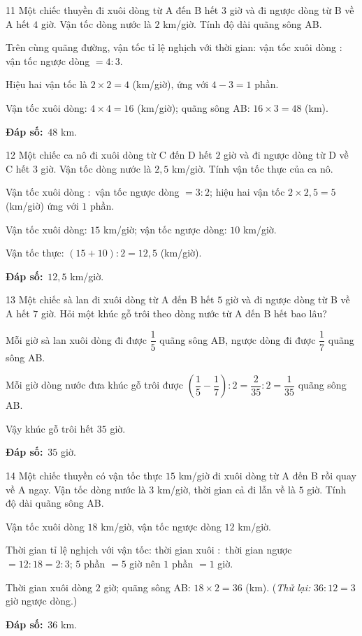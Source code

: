 \documentclass[11pt]{article}
\newif\ifsol \solfalse
\providecommand{\AnsWord}{Đáp số}
\newcommand{\dapso}[1]{\par\textbf{\AnsWord:}\ #1}
\newcommand{\probsol}[1]{%
  \begin{lrbox}{\solmeasure}\begin{minipage}{\dimexpr\linewidth-24pt\relax}#1\end{minipage}\end{lrbox}%
  \ifsol
    \begin{solbox}#1\end{solbox}%
  \else
    \setlength{\solht}{\dimexpr\ht\solmeasure+\dp\solmeasure+0.85cm\relax}%
    \ifdim\solht<1.35cm\setlength{\solht}{1.35cm}\fi
    \begin{tcolorbox}[colback=white,colframe=Line,boxrule=0.8pt,arc=5pt,
      left=8pt,right=8pt,top=4pt,bottom=4pt,height=\solht]{\footnotesize\color{Slate}\itshape\WorkWord}\end{tcolorbox}%
  \fi}
\newcommand{\gap}{\vspace{0.3cm}}
\def\WorkWord{Bài làm:}
\def\AnsWord{Đáp số}
\begin{document}
\gap
\begin{probbox}{11}{\relax}
Một chiếc thuyền đi xuôi dòng từ A đến B hết $3$ giờ và đi ngược dòng từ B về A hết $4$ giờ. Vận tốc dòng nước là $2$ km/giờ. Tính độ dài quãng sông AB.
\end{probbox}
\probsol{
Trên cùng quãng đường, vận tốc tỉ lệ nghịch với thời gian: vận tốc xuôi dòng $:$ vận tốc ngược dòng $=4:3$.\par
Hiệu hai vận tốc là $2\times2=4$ (km/giờ), ứng với $4-3=1$ phần.\par
Vận tốc xuôi dòng: $4\times4=16$ (km/giờ); quãng sông AB: $16\times3=48$ (km).
\dapso{$48$ km.}}
\gap
\begin{probbox}{12}{\relax}
Một chiếc ca nô đi xuôi dòng từ C đến D hết $2$ giờ và đi ngược dòng từ D về C hết $3$ giờ. Vận tốc dòng nước là $2{,}5$ km/giờ. Tính vận tốc thực của ca nô.
\end{probbox}
\probsol{
Vận tốc xuôi dòng $:$ vận tốc ngược dòng $=3:2$; hiệu hai vận tốc $2\times2{,}5=5$ (km/giờ) ứng với $1$ phần.\par
Vận tốc xuôi dòng: $15$ km/giờ; vận tốc ngược dòng: $10$ km/giờ.\par Vận tốc thực: $(15+10):2=12{,}5$ (km/giờ).
\dapso{$12{,}5$ km/giờ.}}
\gap
\begin{probbox}{13}{\relax}
Một chiếc sà lan đi xuôi dòng từ A đến B hết $5$ giờ và đi ngược dòng từ B về A hết $7$ giờ. Hỏi một khúc gỗ trôi theo dòng nước từ A đến B hết bao lâu?
\end{probbox}
\probsol{
Mỗi giờ sà lan xuôi dòng đi được $\dfrac15$ quãng sông AB, ngược dòng đi được $\dfrac17$ quãng sông AB.\par
Mỗi giờ dòng nước đưa khúc gỗ trôi được $\left(\dfrac15-\dfrac17\right):2=\dfrac2{35}:2=\dfrac1{35}$ quãng sông AB.\par Vậy khúc gỗ trôi hết $35$ giờ.
\dapso{$35$ giờ.}}
\gap
\begin{probbox}{14}{\relax}
Một chiếc thuyền có vận tốc thực $15$ km/giờ đi xuôi dòng từ A đến B rồi quay về A ngay. Vận tốc dòng nước là $3$ km/giờ, thời gian cả đi lẫn về là $5$ giờ. Tính độ dài quãng sông AB.
\end{probbox}
\probsol{
Vận tốc xuôi dòng $18$ km/giờ, vận tốc ngược dòng $12$ km/giờ.\par
Thời gian tỉ lệ nghịch với vận tốc: thời gian xuôi $:$ thời gian ngược $=12:18=2:3$; $5$ phần $=5$ giờ nên $1$ phần $=1$ giờ.\par
Thời gian xuôi dòng $2$ giờ; quãng sông AB: $18\times2=36$ (km). (\emph{Thử lại:} $36:12=3$ giờ ngược dòng.)
\dapso{$36$ km.}}
\end{document}
